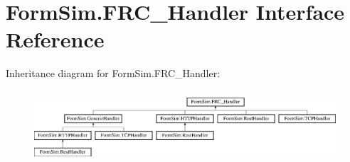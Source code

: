 \hypertarget{interface_form_sim_1_1_f_r_c___handler}{}\section{Form\+Sim.\+F\+R\+C\+\_\+\+Handler Interface Reference}
\label{interface_form_sim_1_1_f_r_c___handler}
Inheritance diagram for Form\+Sim.\+F\+R\+C\+\_\+\+Handler\+:\begin{figure}[H]
\begin{center}
\leavevmode
\includegraphics[height=2.748466cm]{interface_form_sim_1_1_f_r_c___handler}
\end{center}
\end{figure}
